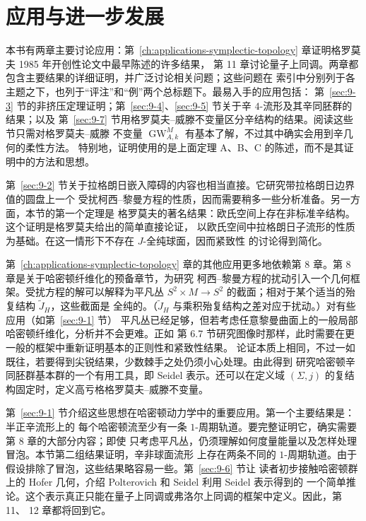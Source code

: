 
\section{应用与进一步发展}\label{sec:1-5}

本书有两章主要讨论应用：第~\ref{ch:applications-symplectic-topology} 章证明格罗莫夫 1985 年开创性论文中最早陈述的许多结果，
第 11 章讨论量子上同调。两章都包含主要结果的详细证明，并广泛讨论相关问题；这些问题在
索引中分别列于各主题之下，也列于“评注”和“例”两个总标题下。最易入手的应用包括：
第~\ref{sec:9-3} 节的非挤压定理证明；第~\ref{sec:9-4}、\ref{sec:9-5} 节关于辛 $4$-流形及其辛同胚群的结果；以及
第~\ref{sec:9-7} 节用格罗莫夫--威滕不变量区分辛结构的结果。阅读这些节只需对格罗莫夫--威滕
不变量 $\operatorname{GW}_{A,k}^M$ 有基本了解，不过其中确实会用到辛几何的柔性方法。
特别地，证明使用的是上面定理 A、B、C 的陈述，而不是其证明中的方法和思想。

第~\ref{sec:9-2} 节关于拉格朗日嵌入障碍的内容也相当直接。它研究带拉格朗日边界值的圆盘上一个
受扰柯西--黎曼方程的性质，因而需要稍多一些分析准备。另一方面，本节的第一个定理是
格罗莫夫的著名结果：欧氏空间上存在非标准辛结构。这个证明是格罗莫夫给出的简单直接论证，
以欧氏空间中拉格朗日子流形的性质为基础。在这一情形下不存在 $J$-全纯球面，因而紧致性
的讨论得到简化。

第~\ref{ch:applications-symplectic-topology} 章的其他应用更多地依赖第 8 章。第 8 章是关于哈密顿纤维化的预备章节，为研究
柯西--黎曼方程的扰动引入一个几何框架。受扰方程的解可以解释为平凡丛
$S^2\times M\to S^2$ 的截面；相对于某个适当的殆复结构 $\widetilde J_H$，这些截面是
全纯的。（$\widetilde J_H$ 与乘积殆复结构之差对应于扰动。）对有些应用（如第~\ref{sec:9-1} 节）
平凡丛已经足够，但若考虑任意黎曼曲面上的一般局部哈密顿纤维化，分析并不会更难。正如
第 6.7 节研究图像时那样，此时需要在更一般的框架中重新证明基本的正则性和紧致性结果。
论证本质上相同，不过一如既往，若要得到尖锐结果，少数棘手之处仍须小心处理。由此得到
研究哈密顿辛同胚群基本群的一个有用工具，即 Seidel 表示。还可以在定义域 $(\Sigma,j)$
的复结构固定时，定义高亏格格罗莫夫--威滕不变量。

第~\ref{sec:9-1} 节介绍这些思想在哈密顿动力学中的重要应用。第一个主要结果是：半正辛流形上的
每个哈密顿流至少有一条 $1$-周期轨道。要完整证明它，确实需要第 8 章的大部分内容；即使
只考虑平凡丛，仍须理解如何度量能量以及怎样处理冒泡。本节第二组结果证明，辛非球面流形
上存在两条不同的 $1$-周期轨道。由于假设排除了冒泡，这些结果略容易一些。第~\ref{sec:9-6} 节让
读者初步接触哈密顿群上的 Hofer 几何，介绍 Polterovich 和 Seidel 利用 Seidel 表示得到的
一个简单推论。这个表示真正只能在量子上同调或弗洛尔上同调的框架中定义。因此，第 11、
12 章都将回到它。

